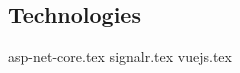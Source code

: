 \documentclass{article}
\begin{document}
\subsection{Technologies}

{asp-net-core.tex}
{signalr.tex}
{vuejs.tex}
\end{document}
